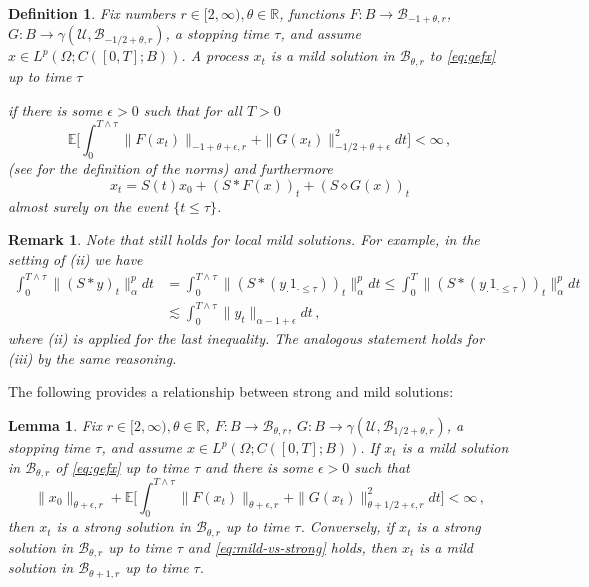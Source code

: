 \documentclass[final]{amsart}
\newtheorem{deff}[thm]{Definition}
\newtheorem{lem}[thm]{Lemma}
\newtheorem{rem}[thm]{Remark}
\numberwithin{thm}{section}
\numberwithin{equation}{section}
\newcommand{\E}{\mathbb{E}}
\newcommand{\U}{\mathcal{U}}
\newcommand{\R}{\mathbb{R}}
\newcommand{\B}{\mathcal{B}}
\begin{document}
\begin{deff}\label{def:mild}
Fix numbers $r \in [2,\infty), \theta \in \R$, functions $F: B \to \B_{-1+\theta, r}$, $G: B \to \gamma(\U,\B_{-1/2+\theta, r})$, a stopping time $\tau$, and assume $x \in L^p(\Omega;C([0,T];B))$.  
     A process $x_t$ is a mild solution in $\B_{\theta,r}$ to \eqref{eq:gefx} up to time $\tau$
    
    
    
    
    if there is some $\epsilon > 0$ such that for all $T > 0$
    \begin{equation}\label{eq:int-condition-mild}
        \E\Big[\int_0^{T \wedge \tau} \|F(x_t)\|_{-1+\theta + \epsilon, r} + \|G(x_t)\|_{-1/2+\theta +\epsilon}^2dt\Big] < \infty \,,
    \end{equation}
    (see  for the definition of the norms)  
    and furthermore
    \begin{equation}\label{eq:mild-sol-def}
        x_t = S(t)x_0 +(S*F(x))_t + (S \diamond G(x))_t
    \end{equation}
    almost surely on the event $\{t \leq \tau\}$.
\end{deff}

\begin{rem}\label{rem:convolution-bounds-hold-locally}
    Note that  still holds for local mild solutions. For example, in the setting of (ii) we have
    \begin{align*}
        \int_0^{T\wedge \tau} \|(S * y)_t\|_\alpha^pdt &= \int_0^{T \wedge \tau} \|(S * (y_\cdot1_{\cdot \leq \tau}))_t\|_\alpha^pdt \leq \int_0^T \|(S * (y_\cdot1_{\cdot \leq \tau}))_t\|_\alpha^pdt \\
        &\lesssim \int_0^{T \wedge \tau} \|y_t\|_{\alpha-1+\epsilon}dt \,,
    \end{align*}
    where (ii) is applied for the last inequality. The analogous statement holds for (iii) by the same reasoning.
\end{rem}

The following provides a relationship between strong and mild solutions:

\begin{lem}\label{mild-strong}
Fix $r \in [2,\infty), \theta \in \R$, $F: B \to \B_{\theta, r}$, $G: B \to \gamma(\U,\B_{1/2+\theta, r})$, a stopping time $\tau$, and assume $x \in L^p(\Omega;C([0,T];B))$.
    If $x_t$ is a mild solution in $\B_{\theta,r}$ of \eqref{eq:gefx} up to time $\tau$ and there is some $\epsilon > 0$ such that
    \begin{equation}\label{eq:mild-vs-strong}
        \|x_0\|_{\theta + \epsilon,r} + \E\Big[\int_0^{T \wedge \tau} \|F(x_t)\|_{\theta + \epsilon,r} + \|G(x_t)\|_{\theta + 1/2+\epsilon, r}^2dt\Big] < \infty \,,
    \end{equation}
    then $x_t$ is a strong solution in $\B_{\theta,r}$ up to time $\tau$. Conversely, if $x_t$ is a strong solution in $\B_{\theta,r}$ up to time $\tau$ and \eqref{eq:mild-vs-strong} holds, then $x_t$ is a mild solution in $\B_{\theta+1,r}$ up to time $\tau$.
\end{lem}
\end{document}
